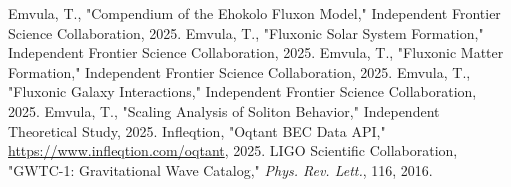 \documentclass[11pt]{article}
\begin{document}
\begin{thebibliography}{9}
Emvula, T., "Compendium of the Ehokolo Fluxon Model," Independent Frontier Science Collaboration, 2025.
Emvula, T., "Fluxonic Solar System Formation," Independent Frontier Science Collaboration, 2025.
Emvula, T., "Fluxonic Matter Formation," Independent Frontier Science Collaboration, 2025.
Emvula, T., "Fluxonic Galaxy Interactions," Independent Frontier Science Collaboration, 2025.
Emvula, T., "Scaling Analysis of Soliton Behavior," Independent Theoretical Study, 2025.
Infleqtion, "Oqtant BEC Data API," \url{https://www.infleqtion.com/oqtant}, 2025.
LIGO Scientific Collaboration, "GWTC-1: Gravitational Wave Catalog," \textit{Phys. Rev. Lett.}, 116, 2016.
\end{thebibliography}
\end{document}
